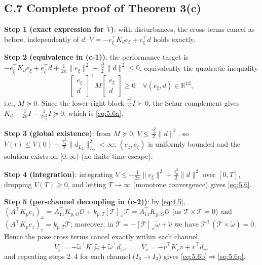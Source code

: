 \subsection*{C.7 Complete proof of Theorem 3(c)}

\textbf{Step 1 (exact expression for $\dot V$)}: with disturbances, the cross terms cancel as before, independently of $d$:
$\dot V=-e_\xi^\top K_de_\xi+e_\xi^\top d$ holds exactly.

\textbf{Step 2 (equivalence in (c-1))}: the performance target is
$-e_\xi^\top K_de_\xi+e_\xi^\top d+\tfrac1{2\kappa}\|e_\xi\|^2-\tfrac{\gamma_a^2}2\|d\|^2\le0$,
equivalently the quadratic inequality
\begin{equation*}
\begin{bmatrix}e_\xi\\ d\end{bmatrix}^{\!\top}\!M\!
\begin{bmatrix}e_\xi\\ d\end{bmatrix}\ge0\quad\forall(e_\xi,d)\in\mathbb R^{12},
\end{equation*}
i.e., $M\succeq0$. Since the lower-right block $\tfrac{\gamma_a^2}2I\succ0$, the Schur complement gives $K_d-\tfrac1{2\kappa}I-\tfrac1{2\gamma_a^2}I\succeq0$, which is \eqref{eq:5.6a}.

\textbf{Step 3 (global existence)}: from $M\succeq0$, $\dot V\le\tfrac{\gamma_a^2}2\|d\|^2$, so $V(t)\le V(0)+\tfrac{\gamma_a^2}2\|d_{L_2}\|_{L_2}^2<\infty$; $(e_z,e_\xi)$ is uniformly bounded and the solution exists on $[0,\infty)$ (no finite-time escape).

\textbf{Step 4 (integration)}: integrating $\dot V\le-\tfrac1{2\kappa}\|e_\xi\|^2+\tfrac{\gamma_a^2}2\|d\|^2$ over $[0,T]$, dropping $V(T)\ge0$, and letting $T\to\infty$ (monotone convergence) gives \eqref{eq:5.6}.

\textbf{Step 5 (per-channel decoupling in (c-2))}: by \eqref{eq:4.5},
$(A^\top K_pe_z)_\omega=A_{11}^\top K_{p,O}\mathcal O+k_{p,T}[\mathcal T]_\times\mathcal T=A_{11}^\top K_{p,O}\mathcal O$ (as $\mathcal T\times\mathcal T=0$) and $(A^\top K_pe_z)_v=k_{p,T}\mathcal T$; moreover, in $\dot{\mathcal T}=-[\mathcal T]_\times\tilde\omega+\tilde v$ we have $\mathcal T^\top(\mathcal T\times\tilde\omega)=0$. Hence the pose cross terms cancel exactly within each channel,
\begin{equation*}
\dot V_\omega=-\tilde\omega^\top K_\omega\tilde\omega+\tilde\omega^\top d_\omega,
\qquad
\dot V_v=-\tilde v^\top K_v\tilde v+\tilde v^\top d_v ,
\end{equation*}
and repeating steps 2--4 for each channel ($I_6\to I_3$) gives \eqref{eq:5.6b}$\Rightarrow$\eqref{eq:5.6p}.

